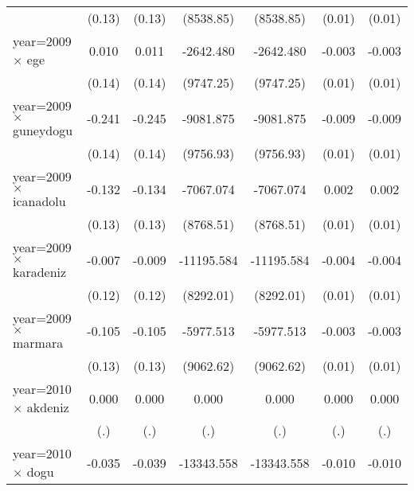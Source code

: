 {\begin{tabular}{l*{6}{c}}
                    &      (0.13)         &      (0.13)         &   (8538.85)         &   (8538.85)         &      (0.01)         &      (0.01)         \\
year=2009 $\times$ ege&       0.010         &       0.011         &   -2642.480         &   -2642.480         &      -0.003         &      -0.003         \\
                    &      (0.14)         &      (0.14)         &   (9747.25)         &   (9747.25)         &      (0.01)         &      (0.01)         \\
year=2009 $\times$ guneydogu&      -0.241         &      -0.245         &   -9081.875         &   -9081.875         &      -0.009         &      -0.009         \\
                    &      (0.14)         &      (0.14)         &   (9756.93)         &   (9756.93)         &      (0.01)         &      (0.01)         \\
year=2009 $\times$ icanadolu&      -0.132         &      -0.134         &   -7067.074         &   -7067.074         &       0.002         &       0.002         \\
                    &      (0.13)         &      (0.13)         &   (8768.51)         &   (8768.51)         &      (0.01)         &      (0.01)         \\
year=2009 $\times$ karadeniz&      -0.007         &      -0.009         &  -11195.584         &  -11195.584         &      -0.004         &      -0.004         \\
                    &      (0.12)         &      (0.12)         &   (8292.01)         &   (8292.01)         &      (0.01)         &      (0.01)         \\
year=2009 $\times$ marmara&      -0.105         &      -0.105         &   -5977.513         &   -5977.513         &      -0.003         &      -0.003         \\
                    &      (0.13)         &      (0.13)         &   (9062.62)         &   (9062.62)         &      (0.01)         &      (0.01)         \\
year=2010 $\times$ akdeniz&       0.000         &       0.000         &       0.000         &       0.000         &       0.000         &       0.000         \\
                    &         (.)         &         (.)         &         (.)         &         (.)         &         (.)         &         (.)         \\
year=2010 $\times$ dogu&      -0.035         &      -0.039         &  -13343.558         &  -13343.558         &      -0.010         &      -0.010         \\

\end{tabular}}
